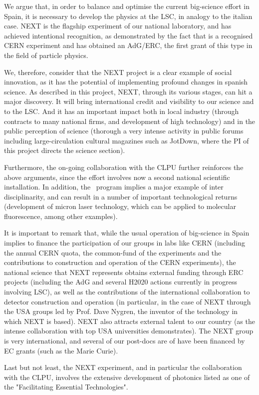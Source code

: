 We argue that, in order to balance and optimise the current big-science effort in Spain, it is necessary to develop the physics at the LSC, in analogy to the italian case. NEXT is the flagship experiment of our national laboratory, and has achieved intentional recognition, as demonstrated by the fact that is a recognised CERN experiment and has obtained an AdG/ERC, the first grant of this type in the field of particle physics. 

We, therefore, consider that the NEXT project is a clear example of social innovation, as it has the potential of implementing profound changes in spanish science. As described in this project, NEXT, through its various stages, can hit a major discovery. It will bring international credit and visibility to our science and to the LSC. And it has an important impact both in local industry (through contracts to many national firms, and development of high technology) and in the public perception of science (thorough a very intense activity in public forums including large-circulation cultural magazines such as JotDown, where the PI of this project directs the science section). 

Furthermore, the on-going collaboration with the CLPU further reinforces the above arguments, since the effort involves now a second national scientific installation. In addition, the \BATA\ program implies a major example of inter disciplinarity, and can result in a number of important technological returns (development of micron laser technology, which can be applied to molecular fluorescence, among other examples).

It is important to remark that, while the usual operation of big-science in Spain implies to finance the participation of our groups in labs like CERN (including the annual CERN quota, the common-fund of the experiments and the contributions to construction and operation of the CERN experiments), the national science that NEXT represents obtains external funding through ERC projects (including the AdG and several H2020 actions currently in progress involving LSC), as well as the contributions of the international collaboration to detector construction and operation (in particular, in the case of NEXT through the USA groups led by Prof. Dave Nygren, the inventor of the technology in which NEXT is based). NEXT also attracts external talent to our country (as the intense collaboration with top USA universities demonstrates). The NEXT group is very international, and several of our post-docs are of have been financed by EC grants (such as the Marie Curie). 

Last but not least, the NEXT experiment, and in particular the collaboration with the CLPU, involves the extensive development of photonics listed as one of the  "Facilitating Essential Technologies".